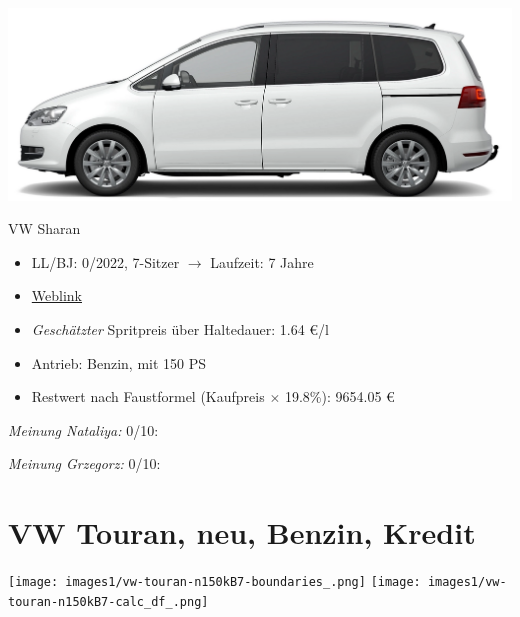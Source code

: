 \documentclass[landscape, DIV=99, 14pt]{scrartcl}
\begin{document}
\pagebreak
\begin{center}
\includegraphics[width=0.9\columnwidth]{cars/vw-sharan.png}

VW Sharan
\end{center}

\begin{itemize}
    \item LL/BJ: 0/2022, 7-Sitzer $\rightarrow$ Laufzeit: 7 Jahre
    \item \href{https://www.volkswagen.de/de/konfigurator.html/__app/sharan/sharan/highline.app?buildabilityStatus-app=buildable&category-app=private&carlineId-app=31605&salesGroupId-app=32850&trimName-app=Highline&modelId-app=7N24GY%24GYOIYOI%24GYOUYOU&modelVersion-app=0&modelYear-app=2022&exteriorId-app=F14+0Q0Q&interiorId-app=F56+++++BY&options-app=GPF2PF2-GWBEWBE-GWG1WG1-GWH3WH3-GYOWYOW-MAHV1M6-MKSUKA2-MSSH4KF}{Weblink}
    \item \emph{Gesch\"atzter} Spritpreis \"uber Haltedauer: 1.64 \euro{}/l
    \item Antrieb: Benzin, mit 150 PS
    \item Restwert nach Faustformel (Kaufpreis $\times$ 19.8\%): 9654.05 \euro{}
\end{itemize}

\begin{small}
\emph{Meinung Nataliya:} 0/10: 
        
\emph{Meinung Grzegorz:} 0/10: 
\end{small}

\pagebreak


\twocolumn

\section*{VW Touran, neu, Benzin, Kredit}
\begin{center}
\texttt{[image: images1/vw-touran-n150kB7-boundaries\_.png]}
\null
\vspace{0.5cm}
\texttt{[image: images1/vw-touran-n150kB7-calc\_df\_.png]}
\end{center}
\end{document}
